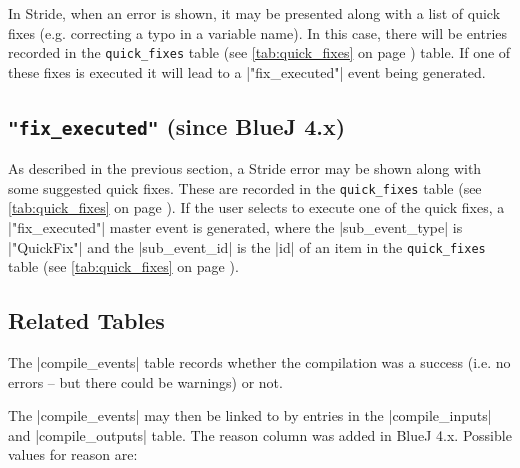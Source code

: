 \documentclass{report}
\newcommand{\myref}[1]{\autoref{#1} on page \pageref*{#1}}
\newcommand{\tabref}[1]{\lstinline|#1| table (see \myref{tab:#1})}
\begin{document}
In Stride, when an error is shown, it may be presented along with a list of quick fixes (e.g.
correcting a typo in a variable name).  In this case, there will be entries recorded in the
\tabref{quick_fixes} table.  If one of these fixes is executed it will lead to a |"fix_executed"|
event being generated.

\subsection{\lstinline!"fix_executed"! (since BlueJ 4.x)}

As described in the previous section, a Stride error may be shown along with some suggested quick
fixes.  These are recorded in the \tabref{quick_fixes}.  If the user selects to execute one
of the quick fixes, a |"fix_executed"| master event is generated, where the |sub_event_type| is |"QuickFix"|
and the |sub_event_id| is the |id| of an item in the \tabref{quick_fixes}.

\subsection{Related Tables}

The |compile_events| table records whether the compilation was a success
(i.e. no errors -- but there could be warnings) or not.


The |compile_events| may then be linked to by entries in the |compile_inputs| and
|compile_outputs| table.  The reason column was added in BlueJ 4.x.
Possible values for reason are:
\end{document}
